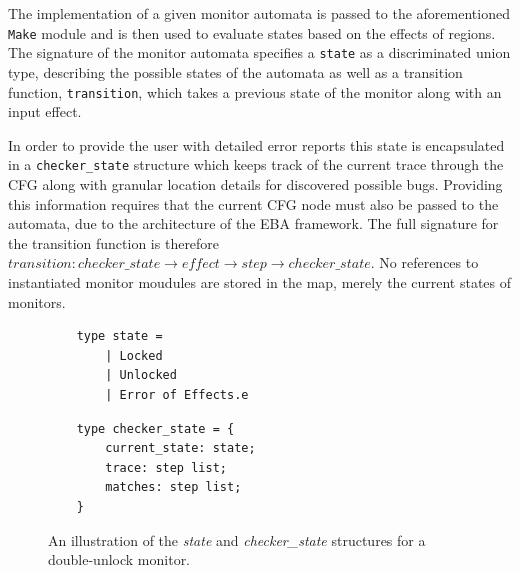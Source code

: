 
\newpar The implementation of a given monitor automata is passed to the aforementioned \texttt{Make} module and is then used to evaluate states based on the effects of regions. The signature of the monitor automata specifies a \texttt{state} as a discriminated union type, describing the possible states of the automata as well as a transition function, \texttt{transition}, which takes a previous state of the monitor along with an input effect. 

\newpar In order to provide the user with detailed error reports this state is encapsulated in a \texttt{checker\_state} structure which keeps track of the current trace through the CFG along with granular location details for discovered possible bugs. Providing this information requires that the current CFG node must also be passed to the automata, due to the architecture of the EBA framework. The full signature for the transition function is therefore $transition: \mathit{checker\_state} \rightarrow \mathit{effect} \rightarrow \mathit{step} \rightarrow \mathit{checker\_state}$. No references to instantiated monitor moudules are stored in the map, merely the current states of monitors. 

\begin{figure}[H]
    \centering
    \begin{minipage}[t]{0.45\textwidth}
    \begin{verbatim}
    type state = 
        | Locked
        | Unlocked
        | Error of Effects.e
    \end{verbatim}
    \end{minipage}
    \hspace*{0.05\textwidth}
    \begin{minipage}[t]{0.45\textwidth}
    \begin{verbatim}
    type checker_state = {
        current_state: state;
        trace: step list;
        matches: step list;
    }
    \end{verbatim}
    \end{minipage}
    \caption{An illustration of the \textit{state} and \textit{checker\_state} structures for a double-unlock monitor.}
    \label{checker-state}
    \end{figure}


